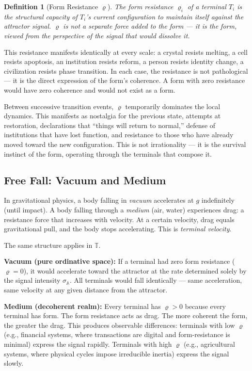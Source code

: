 \documentclass[12pt,a4paper]{article}
\newtheorem{definition}{Definition}[section]
\newcommand{\tspc}{\mathbb{T}}
\newcommand{\rhof}{\varrho}
\begin{document}
\begin{definition}[Form Resistance $\rhof$]\label{def:rho}
The form resistance $\rhof_i$ of a terminal $T_i$ is the structural capacity of $T_i$'s current configuration to maintain itself against the attractor signal. $\rhof$ is not a separate force added to the form --- it \emph{is} the form, viewed from the perspective of the signal that would dissolve it.
\end{definition}

This resistance manifests identically at every scale: a crystal resists melting, a cell resists apoptosis, an institution resists reform, a person resists identity change, a civilization resists phase transition. In each case, the resistance is not pathological --- it is the direct expression of the form's coherence. A form with zero resistance would have zero coherence and would not exist as a form.

Between successive transition events, $\rhof$ temporarily dominates the local dynamics. This manifests as nostalgia for the previous state, attempts at restoration, declarations that ``things will return to normal,'' defense of institutions that have lost function, and resistance to those who have already moved toward the new configuration. This is not irrationality --- it is the survival instinct of the form, operating through the terminals that compose it.


\subsection{Free Fall: Vacuum and Medium}\label{subsec:freefall}

In gravitational physics, a body falling in \emph{vacuum} accelerates at $g$ indefinitely (until impact). A body falling through a \emph{medium} (air, water) experiences drag: a resistance force that increases with velocity. At a certain velocity, drag equals gravitational pull, and the body stops accelerating. This is \emph{terminal velocity}.

The same structure applies in $\tspc$.

\textbf{Vacuum (pure ordinative space):} If a terminal had zero form resistance ($\rhof = 0$), it would accelerate toward the attractor at the rate determined solely by the signal intensity $\sigma_{\mathbb{A}}$. All terminals would fall identically --- same acceleration, same velocity at any given distance from the attractor.

\textbf{Medium (decoherent realm):} Every terminal has $\rhof > 0$ because every terminal has form. The form resistance acts as drag. The more coherent the form, the greater the drag. This produces observable differences: terminals with low $\rhof$ (e.g., financial systems, where transactions are digital and form-resistance is minimal) express the signal rapidly. Terminals with high $\rhof$ (e.g., agricultural systems, where physical cycles impose irreducible inertia) express the signal slowly.
\end{document}
